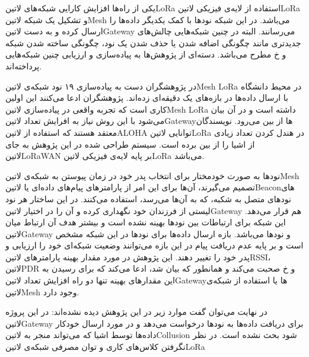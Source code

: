 

یکی از راه‌ها افزایش کارایی شبکه‌های ‌لاتین{LoRa} استفاده از لایه‌ی فیزیکی ‌لاتین{LoRa} و تشکیل یک شبکه ‌لاتین{Mesh} می‌باشد. در این شبکه نودها با کمک یکدیگر داده‌ها را ارسال کرده و به دست ‌لاتین{Gateway} می‌رسانند.
البته در چنین شبکه‌هایی چالش‌های جدیدتری مانند چگونگی اضافه شدن یا حذف شدن یک نود، چگونگی ساخته شدن شبکه و ‌خ مطرح می‌باشد. دسته‌ای از پژوهش‌ها به پیاده‌سازی و ارزیابی چنین شبکه‌هایی پرداخته‌اند.


در  پژوهشگران دست به پیاده‌سازی ۱۹ نود شبکه‌ی ‌لاتین{Mesh LoRa} در محیط دانشگاه با ارسال داده‌ها در بازه‌های یک دقیقه‌ای زده‌اند.
پژوهشگران ادعا می‌کنند این اولین کاری است که تجربه واقعی در پیاده‌سازی ‌لاتین{Mesh LoRa} داشته است و در آن بیان می‌شود با این روش نیاز به افرایش تعداد ‌لاتین{Gateway}ها از بین می‌رود.
نویسندگان معتقد هستند که استفاده از ‌لاتین{ALOHA} توانایی ‌لاتین{LoRa} در هندل کردن تعداد زیادی از اشیا را از بین برده است.
سیستم طراحی شده در این پژوهش به جای ‌لاتین{LoRaWAN} بر پایه لایه‌ی فیزیکی ‌لاتین{LoRa} می‌باشد.

نودها به صورت خودمختار برای انتخاب پدر خود در زمان پیوستن به شبکه‌ی ‌لاتین{Mesh} تصمیم می‌گیرند، آن‌ها برای این امر از پارامترهای پیام‌های داده‌ای یا ‌لاتین{Beacon}های نودهای متصل به شکبه، که به آن‌ها می‌رسد، استفاده می‌کنند.
در این ساختار هر نود لیستی از فرزندان خود نگهداری کرده و آن را در اختیار ‌لاتین{‌Gateway} هم قرار می‌دهد.
این شبکه برای ارتباطات بین نودها بهینه نشده است و بیشتر هدف آن ارتباط میان ‌لاتین{Gateway} و نودها می‌باشد.
بازه ارسال داده‌ها برای نودها در این شبکه مشخص است و بر پایه عدم دریافت پیام در این بازه می‌توانند وضعیت شبکه‌ای خود را ارزیابی و پدر خود را تغییر دهند.
این پژوهش در مورد مقدار بهینه پارامترهای ‌لاتین{RSSI}، ‌لاتین{PDR} و ‌خ صحبت می‌کند و همانطور که بیان شد، ادعا می‌کند که برای رسیدن به این مقدارهای بهینه تنها دو راه افزایش تعداد ‌لاتین{Gateway}ها یا استفاده از شبکه‌ی ‌لاتین{Mesh} وجود دارد.

در نهایت می‌توان گفت موارد زیر در این پژوهش دیده نشده‌اند:
 در این پروژه ‌لاتین{Gateway} برای دریافت داده‌ها به نودها درخواست می‌دهد و در مورد ارسال خودکار داده‌ها توسط اشیا که می‌تواند منجر به ‌لاتین{Collusion} شود بحث نشده است.
 در نظر نگرفتن کلاس‌های کاری و توان مصرفی شبکه‌ی ‌لاتین{LoRa}


